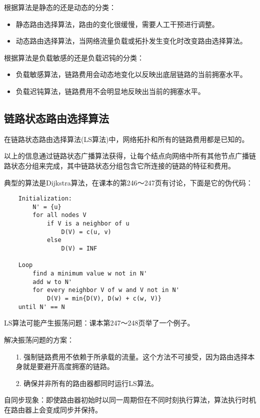 \documentclass[a4paper,left=2.5cm,right=2.5cm,11pt]{article}
\begin{document}
	根据算法是静态的还是动态的分类：
	\begin{itemize}
		\item 静态路由选择算法，路由的变化很缓慢，需要人工干预进行调整。
		\item 动态路由选择算法，当网络流量负载或拓扑发生变化时改变路由选择算法。
	\end{itemize}

	根据算法是负载敏感的还是负载迟钝的分类：
	\begin{itemize}
		\item 负载敏感算法，链路费用会动态地变化以反映出底层链路的当前拥塞水平。
		\item 负载迟钝算法，链路费用不会明显地反映出当前的拥塞水平。
	\end{itemize}

\subsection{链路状态路由选择算法}
	在链路状态路由选择算法(LS算法)中，网络拓扑和所有的链路费用都是已知的。\par

	以上的信息通过链路状态广播算法获得，让每个结点向网络中所有其他节点广播链路状态分组来完成，其中链路状态分组包含它所连接的链路的特征和费用。\par

	典型的算法是Dijkstra算法，在课本的第246～247页有讨论，下面是它的伪代码：
	\begin{lstlisting}
	Initialization:
		N' = {u}
		for all nodes V
			if V is a neighbor of u
				D(V) = c(u, v)
			else
				D(V) = INF

	Loop
		find a minimum value w not in N'
		add w to N'
		for every neighbor V of w and V not in N'
			D(V) = min{D(V), D(w) + c(w, V)}
	until N' == N
	\end{lstlisting}

	LS算法可能产生振荡问题：课本第247～248页举了一个例子。\par

	解决振荡问题的方案：
	\begin{itemize}
		\item[1.] 强制链路费用不依赖于所承载的流量。这个方法不可接受，因为路由选择本身就是要避开高度拥塞的链路。
		\item[2.] 确保并非所有的路由器都同时运行LS算法。
	\end{itemize}

	自同步现象：即使路由器初始时以同一周期但在不同时刻执行算法，算法执行时机在路由器上会变成同步并保持。\par
\end{document}
